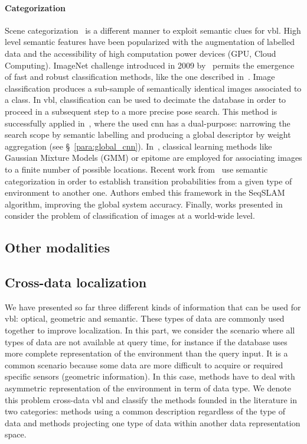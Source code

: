 		\paragraph{Categorization}
			Scene categorization~\citep{Wu2009} is a different manner to exploit semantic clues for \ac{vbl}. High level semantic features have been popularized with the augmentation of labelled data and the accessibility of high computation power devices (GPU, Cloud Computing). ImageNet challenge introduced in 2009 by~\citep{Deng2009} permits the emergence of fast and robust classification methods, like the one described in~\citep{Krizhevsky2012}. Image classification produces a sub-sample of semantically identical images associated to a class. In \ac{vbl}, classification can be used to decimate the database in order to proceed in a subsequent step to a more precise pose search. This method is successfully applied in~\citep{Sunderhauf2015}, where the used \ac{cnn} has a dual-purpose: narrowing the search scope by semantic labelling and producing a global descriptor by weight aggregation (see \S~\ref{para:global_cnn}). In~\citep{torralba2003context,Ni2009}, classical learning methods like Gaussian Mixture Models (GMM) or epitome are employed for associating images to a finite number of possible locations. Recent work from~\citep{Garg2017} use semantic categorization in order to establish transition probabilities from a given type of environment to another one. Authors embed this framework in the SeqSLAM algorithm, improving the global system accuracy. Finally, works presented in~\citep{Hays2008,Weyand2016} consider the problem of classification of images at a world-wide level.

	\subsection{Other modalities}
	\label{subsec:other_modalities}        	
	\citep{Lu2016}
	
	\citep{Bonardi2017}
	
	\citep{Rastgoo2018}
		
				
	\subsection{Cross-data localization}
	\label{subsec:cross_data}        
		We have presented so far three different kinds of information that can be used for \ac{vbl}: optical, geometric and semantic. These types of data are commonly used together to improve localization. In this part, we consider the scenario where all types of data are not available at query time, for instance if the database uses more complete representation of the environment than the query input. It is a common scenario because some data are more difficult to acquire or required specific sensors (\eg geometric information). In this case, methods have to deal with asymmetric representation of the environment in term of data type. We denote this problem cross-data \ac{vbl} and classify the methods founded in the literature in two categories: methods using a common description regardless of the type of data and methods projecting one type of data within another data representation space.
		
